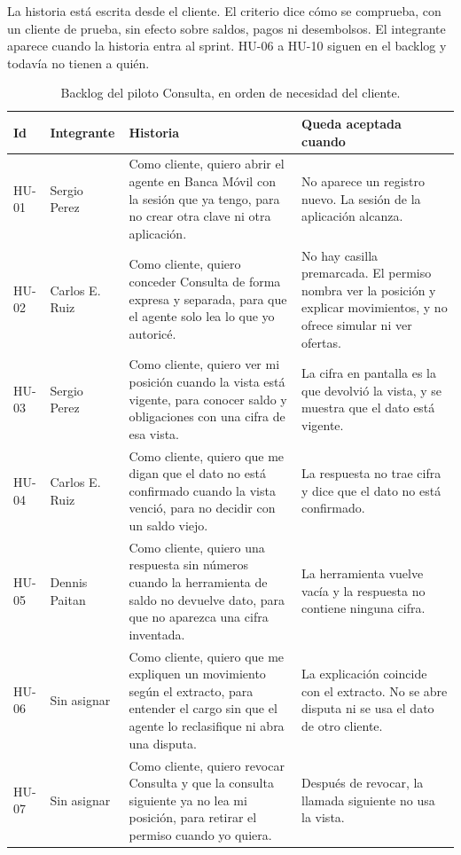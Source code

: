 \documentclass[11pt,a4paper]{article}
\begin{document}
La historia está escrita desde el cliente. El criterio dice cómo se comprueba, con un cliente de prueba, sin efecto sobre saldos, pagos ni desembolsos. El integrante aparece cuando la historia entra al sprint. HU-06 a HU-10 siguen en el backlog y todavía no tienen a quién.

\begin{table}[H]
\centering
\caption{Backlog del piloto Consulta, en orden de necesidad del cliente.}
\footnotesize
\setlength{\tabcolsep}{3.5pt}
\begin{tabularx}{\textwidth}{@{}l >{\raggedright\arraybackslash}p{2.15cm} >{\raggedright\arraybackslash}X >{\raggedright\arraybackslash}X@{}}
\toprule
\textbf{Id} & \textbf{Integrante} & \textbf{Historia} & \textbf{Queda aceptada cuando} \\
\midrule
HU-01 & Sergio Perez & Como cliente, quiero abrir el agente en Banca Móvil con la sesión que ya tengo, para no crear otra clave ni otra aplicación. & No aparece un registro nuevo. La sesión de la aplicación alcanza. \\
HU-02 & Carlos E. Ruiz & Como cliente, quiero conceder Consulta de forma expresa y separada, para que el agente solo lea lo que yo autoricé. & No hay casilla premarcada. El permiso nombra ver la posición y explicar movimientos, y no ofrece simular ni ver ofertas. \\
HU-03 & Sergio Perez & Como cliente, quiero ver mi posición cuando la vista está vigente, para conocer saldo y obligaciones con una cifra de esa vista. & La cifra en pantalla es la que devolvió la vista, y se muestra que el dato está vigente. \\
HU-04 & Carlos E. Ruiz & Como cliente, quiero que me digan que el dato no está confirmado cuando la vista venció, para no decidir con un saldo viejo. & La respuesta no trae cifra y dice que el dato no está confirmado. \\
HU-05 & Dennis Paitan & Como cliente, quiero una respuesta sin números cuando la herramienta de saldo no devuelve dato, para que no aparezca una cifra inventada. & La herramienta vuelve vacía y la respuesta no contiene ninguna cifra. \\
HU-06 & Sin asignar & Como cliente, quiero que me expliquen un movimiento según el extracto, para entender el cargo sin que el agente lo reclasifique ni abra una disputa. & La explicación coincide con el extracto. No se abre disputa ni se usa el dato de otro cliente. \\
HU-07 & Sin asignar & Como cliente, quiero revocar Consulta y que la consulta siguiente ya no lea mi posición, para retirar el permiso cuando yo quiera. & Después de revocar, la llamada siguiente no usa la vista. \\

\end{tabularx}
\end{table}
\end{document}
